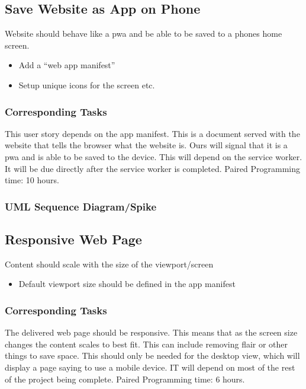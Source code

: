 \documentclass[12pt]{article}
\begin{document}
\subsection{Save Website as App on Phone}
Website should behave like a pwa and be able to be saved to a phones home screen.
\begin{itemize}
  \item Add a “web app manifest”
  \item Setup unique icons for the screen etc.
\end{itemize}
\subsubsection{Corresponding Tasks}
	This user story depends on the app manifest.  This is a document served with the website that tells the browser what the website is.  Ours will signal that it is a pwa and is able to be saved to the device.  This will depend on the service worker.  It will be due directly after the service worker is completed. Paired Programming time: 10 hours.
\subsubsection{UML Sequence Diagram/Spike}

\subsection{Responsive Web Page}
Content should scale with the size of the viewport/screen
\begin{itemize}
  \item Default viewport size should be defined in the app manifest
\end{itemize}
\subsubsection{Corresponding Tasks}
	The delivered web page should be responsive.  This means that as the screen size changes the content scales to best fit.  This can include removing flair or other things to save space.  This should only be needed for the desktop view, which will display a page saying to use a mobile device.  IT will depend on most of the rest of the project being complete.  Paired Programming time: 6 hours.
\end{document}
